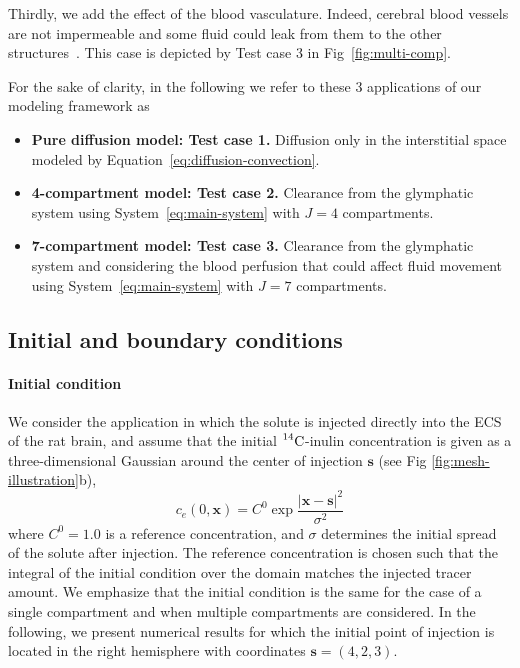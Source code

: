 \documentclass[10pt]{article}
\newcommand{\1}{^{(1)}}
\newcommand{\2}{^{(2)}}
\newcommand {\x}   {\mathbf{x}}
\newcommand{\Cinulin}{$\prescript{14}{}{\text{C}}$-inulin }
\begin{document}
Thirdly, we add the effect of the blood vasculature. Indeed, cerebral blood vessels are not impermeable and some fluid could leak from them to the other structures~\cite{Oreskovic-2010-formation}. This case is depicted by Test case 3 in Fig~\ref{fig:multi-comp}. 

For the sake of clarity, in the following we refer to these $3$ applications of our modeling framework as
\begin{itemize}
    \item \textbf{Pure diffusion model: Test case 1.} Diffusion only in the interstitial space modeled by Equation~\eqref{eq:diffusion-convection}. 
    \item \textbf{4-compartment model: Test case 2.} Clearance from the glymphatic system using System~\eqref{eq:main-system} with $J=4$ compartments. 
    \item \textbf{7-compartment model: Test case 3.} Clearance from the glymphatic system and considering the blood perfusion that could affect fluid movement using System~\eqref{eq:main-system} with $J=7$ compartments. 
\end{itemize}


\subsection{Initial and boundary conditions} \label{subsec:Init-bound}
\paragraph{Initial condition}

We consider the application in which the solute is injected directly into the ECS of the rat brain, and assume that the initial \Cinulin concentration is given as a three-dimensional Gaussian around the center of injection $ \mathbf{s} $ (see Fig \ref{fig:mesh-illustration}b),
\begin{equation}
    c_e(0, \x) = C^0 \exp{\frac{|\x - \mathbf{s}|^2}{\sigma^2}} 
    \label{eq:inulin-initial}
\end{equation}
where $C^0=1.0$ is a reference concentration, and $ \sigma $ determines the initial spread of the solute after injection. The reference concentration is chosen such that the integral of the initial condition over the domain matches the injected tracer amount. We emphasize that the initial condition is the same for the case of a single compartment and when multiple compartments are considered. In the following, we present numerical results for which the initial point of injection is located in the right hemisphere with coordinates $\mathbf{s} = (4,2,3)$. 
\end{document}
